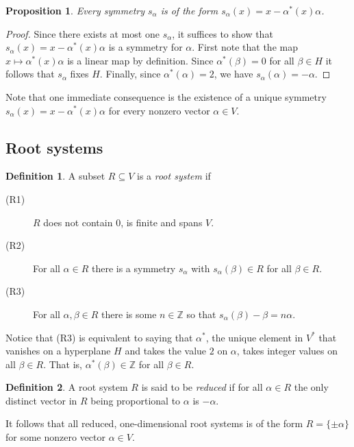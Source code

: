 \documentclass[twoside,utf8]{article}
\theoremstyle{plain}
\newtheorem{proposition}{Proposition}
\theoremstyle{definition}
\newtheorem{definition}{Definition}
\theoremstyle{remark}
\begin{document}
\begin{proposition}
Every symmetry $s_\alpha$ is of the form $s_\alpha(x)=x-\alpha^*(x) \alpha$.
\end{proposition}
\begin{proof}
Since there exists at most one $s_\alpha$, it suffices to show that $s_\alpha(x)=x-\alpha^*(x ) \alpha$ is a symmetry for $\alpha$. First note that the map $x\mapsto \alpha^*(x) \alpha$ is a linear map by definition. Since $\alpha^*(\beta) = 0$ for all $\beta \in H$ it follows that $s_\alpha$ fixes $H$. Finally, since $\alpha^*(\alpha) = 2$, we have $s_\alpha(\alpha)=-\alpha$. 
\end{proof}

\noindent
Note that one immediate consequence is the existence of a unique symmetry $s_\alpha(x)=x-\alpha^*(x) \alpha$ for every nonzero vector $\alpha \in V$. 



\subsection{Root systems}
\begin{definition}
A subset $R\subseteq V$ is a \textit{root system} if
\begin{description}
\item[(R1)] $R$ does not contain $0$, is finite and spans $V$. 
\item[(R2)] For all $\alpha \in R$ there is a symmetry $s_\alpha$ with $s_\alpha(\beta)\in R$ for all $\beta \in R$.
\item[(R3)] For all $\alpha,\beta \in R$ there is some $n\in \mathbb{Z}$ so that $s_\alpha(\beta)-\beta = n\alpha$.
\end{description}
\end{definition}

\noindent
Notice that (R3) is equivalent to saying that $\alpha^*$, the unique element in $V^*$ that vanishes on a hyperplane $H$ and takes the value $2$ on $\alpha$, takes integer values on all $\beta \in R$. That is, $\alpha^*(\beta) \in \mathbb{Z}$ for all $\beta \in R$.

\begin{definition}
A root system $R$ is said to be \textit{reduced} if for all $\alpha \in R$ the only distinct vector in $R$ being proportional to $\alpha$ is $-\alpha$.
\end{definition}

\noindent
It follows that all reduced, one-dimensional root systems is of the form $R=\{\pm \alpha \}$ for some nonzero vector $\alpha \in V$. 
\end{document}
